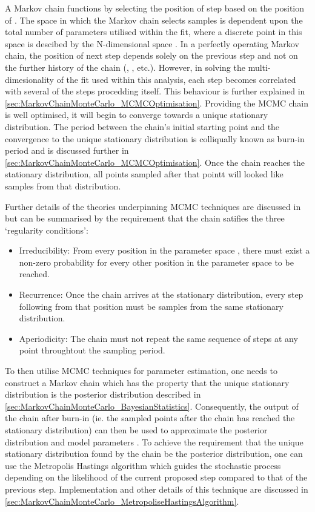 A Markov chain functions by selecting the position of step  based on the position of . The space in which the Markov chain selects samples is dependent upon the total number of parameters utilised within the fit, where a discrete point in this space is descibed by the N-dimensional space . In a perfectly operating Markov chain, the position of next step depends solely on the previous step and not on the further history of the chain (, , etc.). However, in solving the multi-dimesionality of the fit used within this analysis, each step becomes correlated with several of the steps procedding itself. This behaviour is further explained in \autoref{sec:MarkovChainMonteCarlo_MCMCOptimisation}. Providing the MCMC chain is well optimised, it will begin to converge towards a unique stationary distribution. The period between the chain's initial starting point and the convergence to the unique stationary distribution is colliqually known as burn-in period and is discussed further in \autoref{sec:MarkovChainMonteCarlo_MCMCOptimisation}. Once the chain reaches the stationary distribution, all points sampled after that pointt will looked like samples from that distribution.

Further details of the theories underpinning MCMC techniques are discussed in \cite{mcmc_practice} but can be summarised by the requirement that the chain satifies the three `regularity conditions':

\begin{itemize}
\item Irreducibility: From every position in the parameter space , there must exist a non-zero probability for every other position in the parameter space to be reached.
\item Recurrence: Once the chain arrives at the stationary distribution, every step following from that position must be samples from the same stationary distribution.
\item Aperiodicity: The chain must not repeat the same sequence of steps at any point throughtout the sampling period.
\end{itemize}

To then utilise MCMC techniques for parameter estimation, one needs to construct a Markov chain which has the property that the unique stationary distribution is the posterior distribution described in \autoref{sec:MarkovChainMonteCarlo_BayesianStatistics}. Consequently, the output of the chain after burn-in (ie. the sampled points after the chain has reached the stationary distribution) can then be used to approximate the posterior distribution and model parameters \quickmath{\vec{\theta}}. To achieve the requirement that the unique stationary distribution found by the chain be the posterior distribution, one can use the Metropolis Hastings algorithm which guides the stochastic process depending on the likelihood of the current proposed step compared to that of the previous step. Implementation and other details of this technique are discussed in \autoref{sec:MarkovChainMonteCarlo_MetropoliseHastingsAlgorithm}.

